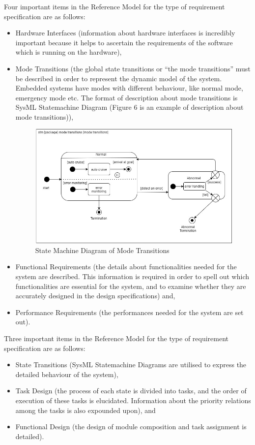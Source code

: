\documentclass[journal, onecolumn]{IEEEtran}
\begin{document}
	Four important items in the Reference Model for the type of requirement specification are as follows:
	\begin{itemize}
		\item{Hardware Interfaces (information about hardware interfaces is incredibly important because it helps to ascertain the requirements of the software which is running on the hardware),}
		\item{Mode Transitions (the global state transitions or “the mode transitions” must be described in order to represent the dynamic model of the system. Embedded systems have modes with different behaviour, like normal mode, emergency mode etc. The format of description about mode transitions is SysML Statemachine Diagram (Figure 6 is an example of description about mode transitions)),}
		\begin{figure}[H]
			\includegraphics[scale=0.3]{cs300.jpg}
			\centering
			\caption{State Machine Diagram of Mode Transitions}
		\end{figure}
		\item{Functional Requirements (the details about functionalities needed for the system are described. This information is required in order to spell out which functionalities are essential for the system, and to examine whether they are accurately designed in the design specifications) and, }
		
		\item{Performance Requirements (the performances needed for the system are set out).}
	\end{itemize}
	
	
	\bigskip
	Three important items in the Reference Model for the type of requirement specification are as follows:
	\begin{itemize}
		\item{State Transitions (SysML Statemachine Diagrams are utilised to express the detailed behaviour of the system),}
		\item{Task Design (the process of each state is divided into tasks, and the order of execution of these tasks is elucidated. Information about the priority relations among the tasks is also expounded upon), and}
		\item{Functional Design (the design of module composition and task assignment is detailed).}
	\end{itemize}
	
\end{document}
